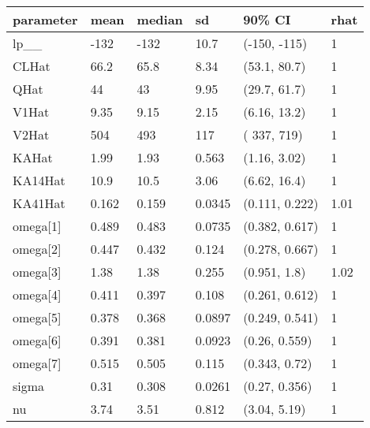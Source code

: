 
\begin{tabular}{l|l|l|l|l|l}
\hline
parameter & mean & median & sd & 90\% CI & rhat\\
\hline
lp\_\_ & -132 & -132 & 10.7 & (-150, -115) & 1\\
\hline
CLHat & 66.2 & 65.8 & 8.34 & (53.1, 80.7) & 1\\
\hline
QHat & 44 & 43 & 9.95 & (29.7, 61.7) & 1\\
\hline
V1Hat & 9.35 & 9.15 & 2.15 & (6.16, 13.2) & 1\\
\hline
V2Hat & 504 & 493 & 117 & ( 337,  719) & 1\\
\hline
KAHat & 1.99 & 1.93 & 0.563 & (1.16, 3.02) & 1\\
\hline
KA14Hat & 10.9 & 10.5 & 3.06 & (6.62, 16.4) & 1\\
\hline
KA41Hat & 0.162 & 0.159 & 0.0345 & (0.111, 0.222) & 1.01\\
\hline
omega[1] & 0.489 & 0.483 & 0.0735 & (0.382, 0.617) & 1\\
\hline
omega[2] & 0.447 & 0.432 & 0.124 & (0.278, 0.667) & 1\\
\hline
omega[3] & 1.38 & 1.38 & 0.255 & (0.951,  1.8) & 1.02\\
\hline
omega[4] & 0.411 & 0.397 & 0.108 & (0.261, 0.612) & 1\\
\hline
omega[5] & 0.378 & 0.368 & 0.0897 & (0.249, 0.541) & 1\\
\hline
omega[6] & 0.391 & 0.381 & 0.0923 & (0.26, 0.559) & 1\\
\hline
omega[7] & 0.515 & 0.505 & 0.115 & (0.343, 0.72) & 1\\
\hline
sigma & 0.31 & 0.308 & 0.0261 & (0.27, 0.356) & 1\\
\hline
nu & 3.74 & 3.51 & 0.812 & (3.04, 5.19) & 1\\
\hline
\end{tabular}
